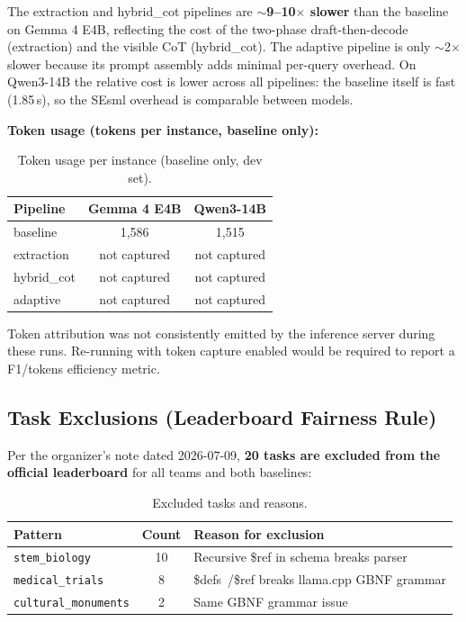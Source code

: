 \documentclass{ceurart}
\begin{document}
The extraction and hybrid\_cot pipelines are \textbf{$\sim$9--10$\times$ slower} than
the baseline on Gemma 4 E4B, reflecting the cost of the two-phase draft-then-decode
(extraction) and the visible CoT (hybrid\_cot).
The adaptive pipeline is only $\sim$2$\times$ slower because its prompt assembly adds
minimal per-query overhead.
On Qwen3-14B the relative cost is lower across all pipelines: the baseline itself is
fast (1.85\,s), so the SEsml overhead is comparable between models.

\textbf{Token usage (tokens per instance, baseline only):}

\begin{table}
  \caption{Token usage per instance (baseline only, dev set).}
  \label{tab:tokens-dev}
  \centering
  \begin{tabular}{lcc}
    \toprule
    Pipeline & Gemma 4 E4B & Qwen3-14B \\
    \midrule
    baseline     & 1,586 & 1,515 \\
    extraction   & not captured & not captured \\
    hybrid\_cot   & not captured & not captured \\
    adaptive     & not captured & not captured \\
    \bottomrule
  \end{tabular}
\end{table}

Token attribution was not consistently emitted by the inference server during these runs.
Re-running with token capture enabled would be required to report a F1/tokens efficiency
metric.

\subsection{Task Exclusions (Leaderboard Fairness Rule)}
\label{sec:task-exclusions}

Per the organizer's note dated 2026-07-09, \textbf{20 tasks are excluded from the
official leaderboard} for all teams and both baselines:

\begin{table}
  \caption{Excluded tasks and reasons.}
  \label{tab:exclusions}
  \centering
  \begin{tabular}{lcl}
    \toprule
    Pattern & Count & Reason for exclusion \\
    \midrule
    \texttt{stem\_biology}       & 10 & Recursive \$ref in schema breaks parser \\
    \texttt{medical\_trials}     & 8  & \$defs~/\$ref breaks llama.cpp GBNF grammar \\
    \texttt{cultural\_monuments} & 2  & Same GBNF grammar issue \\
    \bottomrule
  \end{tabular}
\end{table}
\end{document}
